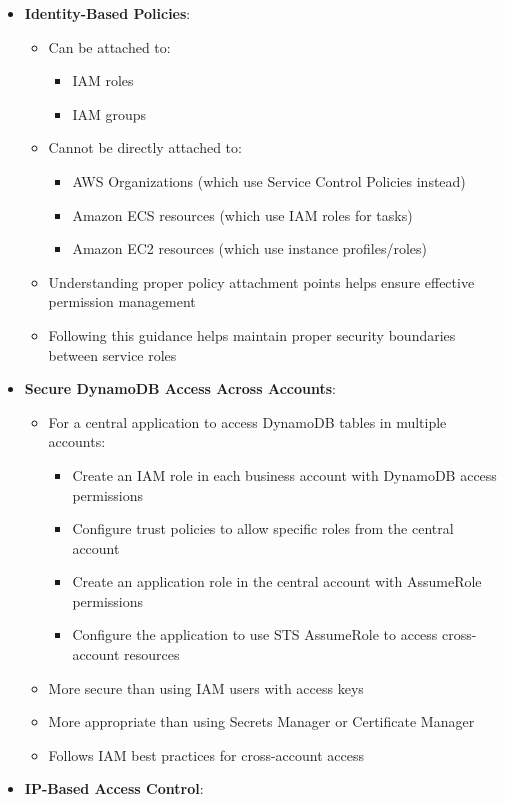 \documentclass[11pt,a4paper]{report}
\begin{document}
\begin{itemize}
  \item \textbf{Identity-Based Policies}:
\begin{itemize}
  \item Can be attached to:
\begin{itemize}
  \item IAM roles
  \item IAM groups
\end{itemize}
  \item Cannot be directly attached to:
\begin{itemize}
  \item AWS Organizations (which use Service Control Policies instead)
  \item Amazon ECS resources (which use IAM roles for tasks)
  \item Amazon EC2 resources (which use instance profiles/roles)
\end{itemize}
  \item Understanding proper policy attachment points helps ensure effective permission management
  \item Following this guidance helps maintain proper security boundaries between service roles
\end{itemize}
  \item \textbf{Secure DynamoDB Access Across Accounts}:
\begin{itemize}
  \item For a central application to access DynamoDB tables in multiple accounts:
\begin{itemize}
  \item Create an IAM role in each business account with DynamoDB access permissions
  \item Configure trust policies to allow specific roles from the central account
  \item Create an application role in the central account with AssumeRole permissions
  \item Configure the application to use STS AssumeRole to access cross-account resources
\end{itemize}
  \item More secure than using IAM users with access keys
  \item More appropriate than using Secrets Manager or Certificate Manager
  \item Follows IAM best practices for cross-account access
\end{itemize}
  \item \textbf{IP-Based Access Control}:

\end{itemize}
\end{document}
